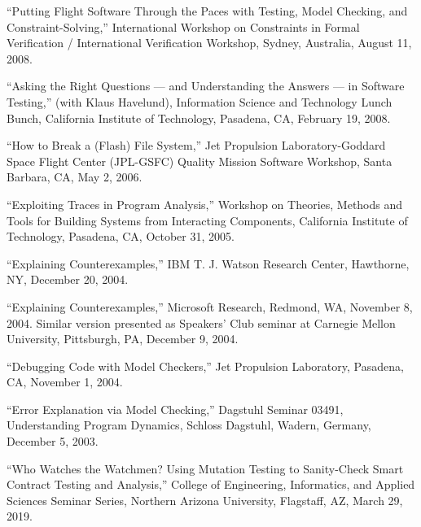 \documentclass[ComputerScience]{vita}
\begin{document}
\begin{vita}
\begin{Invited Talks and Panels}
\item ``Putting Flight Software Through the Paces with Testing, Model Checking, and Constraint-Solving,'' International Workshop on Constraints in Formal Verification / International Verification Workshop, Sydney, Australia, August 11, 2008.

\item ``Asking the Right Questions --- and Understanding the Answers --- in Software Testing,'' (with Klaus Havelund), Information Science and Technology Lunch Bunch, California Institute of Technology, Pasadena, CA, February 19, 2008.

\item ``How to Break a (Flash) File System,'' Jet Propulsion Laboratory-Goddard Space Flight Center (JPL-GSFC) Quality Mission Software Workshop, Santa Barbara, CA, May 2, 2006.

 \item ``Exploiting Traces in Program Analysis,'' Workshop on Theories, Methods and Tools for Building Systems from Interacting Components, California Institute of Technology, Pasadena, CA, October 31, 2005.


  \item ``Explaining Counterexamples,'' IBM T. J. Watson Research Center, Hawthorne, NY, December 20, 2004.

  \item ``Explaining Counterexamples,'' Microsoft Research, Redmond, WA, November 8, 2004.  Similar version presented as Speakers' Club seminar at Carnegie Mellon University, Pittsburgh, PA, December 9, 2004.

  \item ``Debugging Code with Model Checkers,'' Jet Propulsion Laboratory, Pasadena, CA, November 1, 2004.

\item ``Error Explanation via Model Checking,''  Dagstuhl Seminar 03491, Understanding Program Dynamics, Schloss Dagstuhl, Wadern, Germany, December 5, 2003.



\end{Invited Talks and Panels}

\begin{Selected Presentations}
\item ``Who Watches the Watchmen? Using Mutation Testing to 
  Sanity-Check Smart Contract Testing and Analysis,'' College of 
  Engineering, Informatics, and Applied Sciences Seminar Series, 
  Northern Arizona University, Flagstaff, AZ, March 29, 2019. 


\end{Selected Presentations}
\end{vita}
\end{document}
